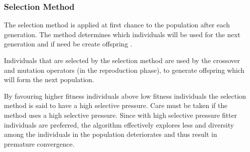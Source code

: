 \subsubsection{Selection Method}
\label{sec:selectionmethod}
The selection method is applied at first chance to the population after each generation. The method determines which individuals will be used for the next generation and if need be create offspring \cite{CoactiveFuzzyGA,CombinedBranchBoundGA,ConstrainedGA}.

Individuals that are selected by the selection method are used by the crossover and mutation operators (in the reproduction phase), to generate offspring which will form the next population\cite{AdaptiveSAGA,AcceleratingGA}.

By favouring higher fitness individuals above low fitness individuals the selection method is said to have a high selective pressure\cite{CompuIntelligenceIntro}. Care must be taken if the method uses a high selective pressure. Since with high selective pressure fitter individuals are preferred, the algorithm effectively explores less and diversity among the individuals in the population deteriorates and thus result in premature convergence\cite{ConstrainedGA, CompuIntelligenceIntro}.

